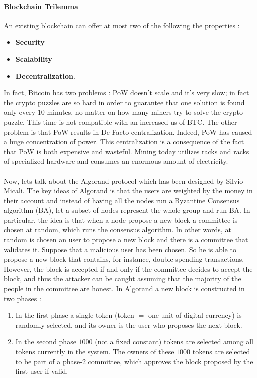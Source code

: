 \paragraph{Blockchain Trilemma} An existing blockchain can offer at most two of the following the properties :
\begin{itemize}
\item \textbf{Security}
\item \textbf{Scalability}
\item \textbf{Decentralization}.
\end{itemize}
In fact, Bitcoin has two problems : PoW doesn't scale and it's very slow; in fact the crypto puzzles are so hard in order to guarantee that one solution is found only every $10$ minutes, no matter on how many miners try to solve the crypto puzzle. This time is not compatible with an increased us of BTC. The other problem is that PoW results in De-Facto centralization. Indeed, PoW has caused a huge concentration of power. This centralization is a consequence of the fact that PoW is both expensive and wasteful. Mining today utilizes racks and racks of specialized hardware and consumes an enormous amount of electricity.\\\\Now, lets talk about the Algorand protocol which has been designed by Silvio Micali. The key ideas of Algorand is that the users are weighted by the money in their account and instead of having all the nodes run a Byzantine Consensus algorithm (BA), let a subset of nodes represent the whole group and run BA. In particular, the idea is that when a node propose a new block a committee is chosen at random, which runs the consensus algorithm. In other words, at random is chosen an user to propose a new block and there is a committee that validates it. Suppose that a malicious user has been chosen. So he is able to propose a new block that contains, for instance, double spending transactions. However, the block is accepted if and only if the committee decides to accept the block, and thus the attacker can be caught assuming that the majority of the people in the committee are honest. In Algorand a new block is constructed in two phases :
\begin{enumerate}
\item In the first phase a single token (token $=$ one unit of digital currency) is randomly selected, and its owner is the user who proposes the next block.
\item In the second phase $1000$ (not a fixed constant) tokens are selected among all tokens currently in the system. The owners of these $1000$ tokens are selected to be part of a phase-2 committee, which approves the block proposed by the first user if valid.
\end{enumerate}
